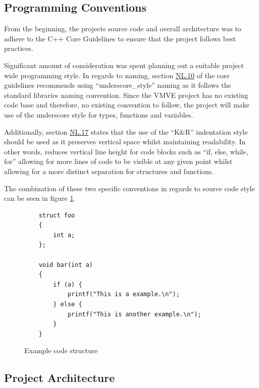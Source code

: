 \documentclass[11pt]{article}
\begin{document}
\subsection{Programming Conventions}
From the beginning, the projects source code and overall architecture was to
adhere to the C++ Core Guidelines \cite{cpp-guidelines} to ensure that the
project follows best practices.

Significant amount of consideration was spent planning out a suitable project
wide programming style. In regards to naming, section
\href{http://isocpp.github.io/CppCoreGuidelines/CppCoreGuidelines#nl10-prefer-underscore_style-names}{NL.10}
of the core guidelines recommends using ``underscore\_style'' naming as it follows
the standard libraries naming convention. Since the VMVE project has no existing
code base and therefore, no existing convention to follow, the project will
make use of the underscore style for types, functions and variables. 

Additionally, section
\href{https://isocpp.github.io/CppCoreGuidelines/CppCoreGuidelines#nl17-use-kr-derived-layout}{NL.17}
states that the use of the ``K\&R''  indentation style \cite{indentation} should
be used as it preserves vertical space whilst maintaining readability. In other
words, reduces vertical line height for code blocks such as ``if, else, while,
for'' allowing for more lines of code to be visible at any given point whilst
allowing for a more distinct separation for structures and functions.

The combination of these two specific conventions in regards to source
code style can be seen in figure \ref{fig:convention}.
\begin{figure}[h!]
  \begin{verbatim}
    struct foo
    {
        int a;
    };

    void bar(int a)
    {
        if (a) {
            printf("This is a example.\n");
        } else {
            printf("This is another example.\n");
        }
    }
  \end{verbatim}
  \caption{Example code structure}
  \label{fig:convention}
\end{figure}



\subsection{Project Architecture}
\end{document}
